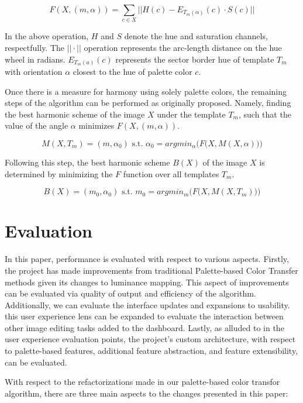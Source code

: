 \documentclass[sigchi]{acmart}
\begin{document}
\[F(X,(m,\alpha)) = \sum_{c \in X} \Big|\Big| H(c) - E_{T_m(\alpha)}(c) \cdot S(c) \Big|\Big|\]

In the above operation, \(H\) and \(S\) denote the hue and saturation channels, respectfully. The \(||\cdot||\) operation represents the arc-length distance on the hue wheel in radians. \(E_{T_m(a)}(c)\) represents the sector border hue of template \(T_m\) with orientation \(\alpha\) closest to the hue of palette color \(c\).

Once there is a measure for harmony using solely palette colors, the remaining steps of the algorithm can be performed as originally proposed. Namely, finding the best harmonic scheme of the image \(X\) under the template \(T_m\), such that the value of the angle \(\alpha\) minimizes \(F(X,(m,\alpha))\).

\[M(X,T_m)=(m,\alpha_0) \text{   s.t.   } \alpha_0= argmin_{\alpha}\Big(F\big(X, M(X,\alpha)\big)\Big)\]

Following this step, the best harmonic scheme \(B(X)\) of the image \(X\) is determined by minimizing the \(F\) function over all templates \(T_m\).

\[B(X)=(m_0,\alpha_0) \text{   s.t.   } m_0= argmin_{m}\Big(F\big(X, M(X,T_m)\big)\Big)\]

\section{Evaluation}

In this paper, performance is evaluated with respect to various aspects. Firstly, the project has made improvements from traditional Palette-based Color Transfer methods given its changes to luminance mapping. This aspect of improvements can be evaluated via quality of output and efficiency of the algorithm. Additionally, we can evaluate the interface updates and expansions to usability. this user experience lens can be expanded to evaluate the interaction between other image editing tasks added to the dashboard. Lastly, as alluded to in the user experience evaluation points, the project's custom architecture, with respect to palette-based features, additional feature abstraction, and feature extensibility, can be evaluated.

With respect to the refactorizations made in our palette-based color transfor algorithm, there are three main aspects to the changes presented in this paper:
\end{document}
